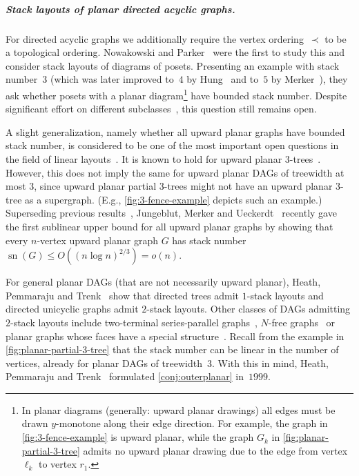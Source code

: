 \documentclass{theoretics}
\DeclareMathOperator{\sn}{sn}
\begin{document}
\subparagraph{Stack layouts of planar directed acyclic graphs.}
For directed acyclic graphs we additionally require the vertex ordering~$\prec$ to be a topological ordering.
Nowakowski and Parker~\cite{Nowakowski1989_DirectedStackNumer} were the first to study this and consider stack layouts of diagrams of posets.
Presenting an example with stack number~$3$ (which was later improved to~$4$ by Hung~\cite{Hung1993_Poset4Stacks} and to~$5$ by Merker~\cite{Merker2020_Thesis}), they ask whether posets with a planar diagram\footnote{In planar diagrams (generally: upward planar drawings) all edges must be drawn $y$-monotone along their edge direction. For example, the graph in \cref{fig:3-fence-example} is upward planar, while the graph $G_k$ in \cref{fig:planar-partial-3-tree} admits no upward planar drawing due to the edge from vertex $\ell_k$ to vertex $r_1$.} have bounded stack number.
Despite significant effort on different subclasses~\cite{Syslo1990_Posets,Alzohairi1997_SeriesParallelPosets,Heath1997_Posets,Heath1999_DAGs2,Heath1999_DAGs1,Alzohairi2001_Lattices,Alhashem2015_StacksPoset}, this question still remains open.

A slight generalization, namely whether all upward planar graphs have bounded stack number, is considered to be one of the most important open questions in the field of linear layouts~\cite{Frati2013_UpwardStackNumber,Noellenburg2021_DAGsWithConstantStackNumber,Jungeblut2022_SublinearUpperBound}.
It is known to hold for upward planar $3$-trees~\cite{Frati2013_UpwardStackNumber,Noellenburg2021_DAGsWithConstantStackNumber}.
However, this does not imply the same for upward planar DAGs of treewidth at most $3$, since upward planar partial $3$-trees might not have an upward planar $3$-tree as a supergraph.
(E.g., \cref{fig:3-fence-example} depicts such an example.)
Superseding previous results~\cite{Frati2013_UpwardStackNumber}, Jungeblut, Merker and Ueckerdt~\cite{Jungeblut2022_SublinearUpperBound} recently gave the first sublinear upper bound for all upward planar graphs by showing that every $n$-vertex upward planar graph $G$ has stack number $\sn(G) \leq O((n \log n)^{2/3}) = o(n)$.

For general planar DAGs (that are not necessarily upward planar), Heath, Pemmaraju and Trenk~\cite{Heath1999_DAGs1} show that directed trees admit $1$-stack layouts and directed unicyclic graphs admit $2$-stack layouts.
Other classes of DAGs admitting $2$-stack layouts include two-terminal series-parallel graphs~\cite{DiGiacomo2006_SeriesParallel}, $N$-free graphs~\cite{Mchedlidze2009_HamiltonianCompletion} or planar graphs whose faces have a special structure~\cite{Binucci2019_UpwardStackST}.
Recall from the example in \cref{fig:planar-partial-3-tree} that the stack number can be linear in the number of vertices, already for planar DAGs of treewidth~$3$.
With this in mind, Heath, Pemmaraju and Trenk~\cite{Heath1999_DAGs1} formulated \cref{conj:outerplanar} in~$1999$.
\end{document}
